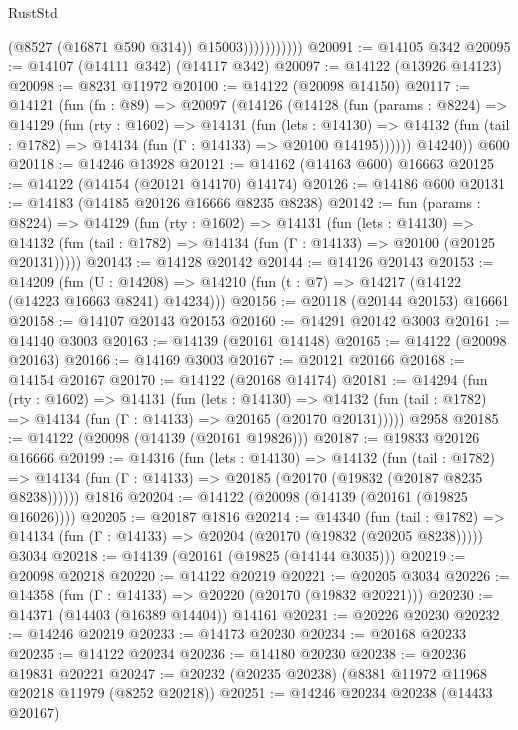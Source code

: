 \begin{lexlean}{RustStd}
\begin{coremodule}
                          (@8527 (@16871 @590 @314))
                          @15003)))))))))))
@20091 := @14105 @342
@20095 := @14107 (@14111 @342) (@14117 @342)
@20097 := @14122 (@13926 @14123)
@20098 := @8231 @11972
@20100 := @14122 (@20098 @14150)
@20117 := @14121
    (fun (fn : @89) =>
    @20097
      (@14126
        (@14128
          (fun (params : @8224) =>
          @14129
            (fun (rty : @1602) =>
            @14131
              (fun (lets : @14130) =>
              @14132 (fun (tail : @1782) => @14134 (fun (Γ : @14133) => @20100 @14195))))))
        @14240))
    @600
@20118 := @14246 @13928
@20121 := @14162 (@14163 @600) @16663
@20125 := @14122 (@14154 (@20121 @14170) @14174)
@20126 := @14186 @600
@20131 := @14183 (@14185 @20126 @16666 @8235 @8238)
@20142 := fun (params : @8224) =>
  @14129
    (fun (rty : @1602) =>
    @14131
      (fun (lets : @14130) =>
      @14132 (fun (tail : @1782) => @14134 (fun (Γ : @14133) => @20100 (@20125 @20131)))))
@20143 := @14128 @20142
@20144 := @14126 @20143
@20153 := @14209
    (fun (U : @14208) => @14210 (fun (t : @7) => @14217 (@14122 (@14223 @16663 @8241) @14234)))
@20156 := @20118 (@20144 @20153) @16661
@20158 := @14107 @20143 @20153
@20160 := @14291 @20142 @3003
@20161 := @14140 @3003
@20163 := @14139 (@20161 @14148)
@20165 := @14122 (@20098 @20163)
@20166 := @14169 @3003
@20167 := @20121 @20166
@20168 := @14154 @20167
@20170 := @14122 (@20168 @14174)
@20181 := @14294
    (fun (rty : @1602) =>
    @14131
      (fun (lets : @14130) =>
      @14132 (fun (tail : @1782) => @14134 (fun (Γ : @14133) => @20165 (@20170 @20131)))))
    @2958
@20185 := @14122 (@20098 (@14139 (@20161 @19826)))
@20187 := @19833 @20126 @16666
@20199 := @14316
    (fun (lets : @14130) =>
    @14132
      (fun (tail : @1782) =>
      @14134 (fun (Γ : @14133) => @20185 (@20170 (@19832 (@20187 @8235 @8238))))))
    @1816
@20204 := @14122 (@20098 (@14139 (@20161 (@19825 @16026))))
@20205 := @20187 @1816
@20214 := @14340
    (fun (tail : @1782) => @14134 (fun (Γ : @14133) => @20204 (@20170 (@19832 (@20205 @8238)))))
    @3034
@20218 := @14139 (@20161 (@19825 (@14144 @3035)))
@20219 := @20098 @20218
@20220 := @14122 @20219
@20221 := @20205 @3034
@20226 := @14358 (fun (Γ : @14133) => @20220 (@20170 (@19832 @20221)))
@20230 := @14371 (@14403 (@16389 @14404)) @14161
@20231 := @20226 @20230
@20232 := @14246 @20219
@20233 := @14173 @20230
@20234 := @20168 @20233
@20235 := @14122 @20234
@20236 := @14180 @20230
@20238 := @20236 @19831 @20221
@20247 := @20232 (@20235 @20238) (@8381 @11972 @11968 @20218 @11979 (@8252 @20218))
@20251 := @14246 @20234 @20238 (@14433 @20167)

\end{coremodule}
\end{lexlean}
